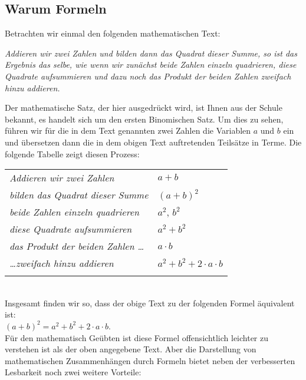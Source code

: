 \subsection{Warum Formeln}
Betrachten wir einmal den folgenden mathematischen Text: 
\begin{center}
\begin{minipage}{14cm}
{\em 
  Addieren wir zwei Zahlen und bilden dann das Quadrat dieser Summe, so ist das Ergebnis das
  selbe, wie wenn wir zunächst beide Zahlen einzeln quadrieren, diese Quadrate aufsummieren 
  und dazu noch das Produkt der beiden Zahlen zweifach hinzu addieren.
}
\end{minipage}
\end{center}
Der mathematische Satz, der hier ausgedrückt wird, ist Ihnen aus der Schule bekannt,
es handelt sich um den ersten Binomischen Satz.  Um dies zu sehen, führen wir für die
in dem Text genannten zwei Zahlen die Variablen $a$ und $b$ ein und übersetzen dann die 
in dem obigen Text auftretenden Teilsätze in Terme.  Die folgende Tabelle zeigt diesen Prozess: \\[0.3cm]
\hspace*{1.3cm} 
\begin{tabular}{ll}
  \emph{Addieren wir zwei Zahlen} & $a+b$ \\
  \emph{bilden das Quadrat dieser Summe} & $(a+b)^2$ \\
  \emph{beide Zahlen einzeln quadrieren} & $a^2$, $b^2$ \\
  \emph{diese Quadrate aufsummieren} & $a^2 + b^2$ \\
  \emph{das Produkt der beiden Zahlen \ldots} & $a\cdot b$ \\
  \emph{\ldots zweifach hinzu addieren} & $a^2 + b^2 + 2\cdot a \cdot b $ \\
  \emph{} & $ $ \\
\end{tabular} \\
Insgesamt finden wir so, dass der obige Text zu der folgenden Formel äquivalent ist: \\[0.2cm]
\hspace*{1.3cm} $(a+b)^2 = a^2 + b^2 + 2\cdot a\cdot b$. \\[0.2cm]
Für den mathematisch Geübten ist diese Formel offensichtlich leichter zu verstehen ist als
der oben angegebene Text.  Aber die Darstellung von mathematischen Zusammenhängen durch
Formeln bietet neben der verbesserten Lesbarkeit noch zwei weitere Vorteile:
